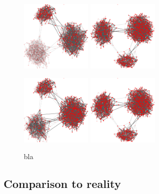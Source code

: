 \begin{figure}
\includegraphics[width=0.3\textwidth]{randomgraphnbrdepth1/network750-crop.pdf}
\hskip2cm
\includegraphics[width=0.3\textwidth]{randomgraphnbrdepth2/network750-crop.pdf}

\includegraphics[width=0.3\textwidth]{randomgraphnbrdepth1/network1000-crop.pdf}
\hskip2cm
\includegraphics[width=0.3\textwidth]{randomgraphnbrdepth2/network1000-crop.pdf}

\caption{bla}
\label{influenceNBRdepthRANDOM}
\end{figure}

\subsection{Comparison to reality}
\label{sec:comparisontoreal}